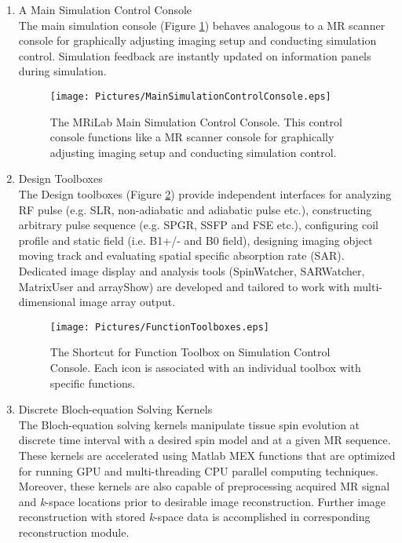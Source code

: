 \documentclass{book}%
\begin{document}
\begin{enumerate}
\item A Main Simulation Control Console \\
The main simulation console (Figure \ref{fig:MainSimulationControlConsole}) behaves analogous to a MR scanner console for graphically adjusting imaging setup and conducting simulation control. Simulation feedback are instantly updated on information panels during simulation.

\begin{figure}[htbp]
	\centering
		\texttt{[image: Pictures/MainSimulationControlConsole.eps]}
	\caption{The MRiLab Main Simulation Control Console. This control console functions like a MR scanner console for graphically adjusting imaging setup and conducting simulation control.}
	\label{fig:MainSimulationControlConsole}
\end{figure}


\item Design Toolboxes \\
The Design toolboxes (Figure \ref{fig:FunctionToolboxes}) provide independent interfaces for analyzing RF pulse (e.g. SLR, non-adiabatic and adiabatic pulse etc.), constructing arbitrary pulse sequence (e.g. SPGR, SSFP and FSE etc.), configuring coil profile and static field (i.e. B1+/- and B0 field), designing imaging object moving track and evaluating spatial specific absorption rate (SAR). Dedicated image display and analysis tools (SpinWatcher, SARWatcher, MatrixUser and arrayShow) are developed and tailored to work with multi-dimensional image array output.


\begin{figure}[htbp]
	\centering
		\texttt{[image: Pictures/FunctionToolboxes.eps]}
	\caption{The Shortcut for Function Toolbox on Simulation Control Console. Each icon is associated with an individual toolbox with specific functions.}
	\label{fig:FunctionToolboxes}
\end{figure}


\item Discrete Bloch-equation Solving Kernels \\
The Bloch-equation solving kernels manipulate tissue spin evolution at discrete time interval with a desired spin model and at a given MR sequence. These kernels are accelerated using Matlab MEX functions that are optimized for running GPU and multi-threading CPU parallel computing techniques. Moreover, these kernels are also capable of preprocessing acquired MR signal and \textit{k}-space locations prior to desirable image reconstruction. Further image reconstruction with stored \textit{k}-space data is accomplished in corresponding reconstruction module.


\end{enumerate}
\end{document}
